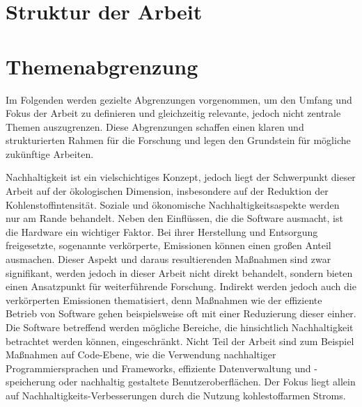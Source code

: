 \section{Struktur der Arbeit}
\section{Themenabgrenzung}
Im Folgenden werden gezielte Abgrenzungen vorgenommen, um den Umfang und Fokus der Arbeit zu definieren und gleichzeitig relevante, jedoch nicht zentrale Themen auszugrenzen.
Diese Abgrenzungen schaffen einen klaren und strukturierten Rahmen für die Forschung und legen den Grundstein für mögliche zukünftige Arbeiten.

Nachhaltigkeit ist ein vielschichtiges Konzept, jedoch liegt der Schwerpunkt dieser Arbeit auf der ökologischen Dimension, insbesondere auf der Reduktion der Kohlenstoffintensität.
Soziale und ökonomische Nachhaltigkeitsaspekte werden nur am Rande behandelt.
Neben den Einflüssen, die die Software ausmacht, ist die Hardware ein wichtiger Faktor.
Bei ihrer Herstellung und Entsorgung freigesetzte, sogenannte verkörperte, Emissionen können einen großen Anteil ausmachen.
Dieser Aspekt und daraus resultierenden Maßnahmen sind zwar signifikant, werden jedoch in dieser Arbeit nicht direkt behandelt, sondern bieten einen Ansatzpunkt für weiterführende Forschung.
Indirekt werden jedoch auch die verkörperten Emissionen thematisiert, denn Maßnahmen wie der effiziente Betrieb von Software gehen beispielsweise oft mit einer Reduzierung dieser einher.
Die Software betreffend werden mögliche Bereiche, die hinsichtlich Nachhaltigkeit betrachtet werden können, eingeschränkt.
Nicht Teil der Arbeit sind zum Beispiel Maßnahmen auf Code-Ebene, wie die Verwendung nachhaltiger Programmiersprachen und Frameworks, effiziente Datenverwaltung und -speicherung oder nachhaltig gestaltete Benutzeroberflächen.
Der Fokus liegt allein auf Nachhaltigkeits-Verbesserungen durch die Nutzung kohlestoffarmen Stroms.

